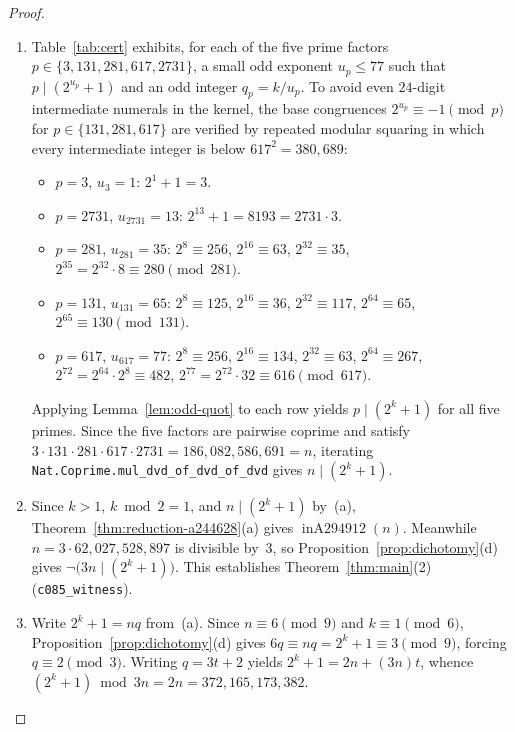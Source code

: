 \documentclass[11pt]{article}
\theoremstyle{definition}
\newcommand{\inA}{\operatorname{inA294912}}
\begin{document}
\begin{proof}
\begin{enumerate}
\item[\textup{(a)}] Table~\ref{tab:cert} exhibits, for each of the five prime factors $p \in \{3, 131, 281, 617, 2731\}$, a small odd exponent $u_p \le 77$ such that $p \mid (2^{u_p} + 1)$ and an odd integer $q_p = k / u_p$. To avoid even $24$-digit intermediate numerals in the kernel, the base congruences $2^{u_p} \equiv -1 \pmod p$ for $p \in \{131, 281, 617\}$ are verified by repeated modular squaring in which every intermediate integer is below $617^2 = 380{,}689$:
\begin{itemize}
\item $p = 3$, $u_3 = 1$: $2^1 + 1 = 3$.
\item $p = 2731$, $u_{2731} = 13$: $2^{13} + 1 = 8193 = 2731 \cdot 3$.
\item $p = 281$, $u_{281} = 35$: $2^8 \equiv 256$, $2^{16} \equiv 63$, $2^{32} \equiv 35$, $2^{35} = 2^{32} \cdot 8 \equiv 280 \pmod{281}$.
\item $p = 131$, $u_{131} = 65$: $2^8 \equiv 125$, $2^{16} \equiv 36$, $2^{32} \equiv 117$, $2^{64} \equiv 65$, $2^{65} \equiv 130 \pmod{131}$.
\item $p = 617$, $u_{617} = 77$: $2^8 \equiv 256$, $2^{16} \equiv 134$, $2^{32} \equiv 63$, $2^{64} \equiv 267$, $2^{72} = 2^{64} \cdot 2^8 \equiv 482$, $2^{77} = 2^{72} \cdot 32 \equiv 616 \pmod{617}$.
\end{itemize}
Applying Lemma~\ref{lem:odd-quot} to each row yields $p \mid (2^k + 1)$ for all five primes. Since the five factors are pairwise coprime and satisfy $3 \cdot 131 \cdot 281 \cdot 617 \cdot 2731 = 186{,}082{,}586{,}691 = n$, iterating \texttt{Nat.Coprime.mul\_dvd\_of\_dvd\_of\_dvd} gives $n \mid (2^k + 1)$.
\item[\textup{(b)}] Since $k > 1$, $k \bmod 2 = 1$, and $n \mid (2^k + 1)$ by~(a), Theorem~\ref{thm:reduction-a244628}(a) gives $\inA(n)$. Meanwhile $n = 3 \cdot 62{,}027{,}528{,}897$ is divisible by~$3$, so Proposition~\ref{prop:dichotomy}(d) gives $\neg\bigl(3n \mid (2^k + 1)\bigr)$. This establishes Theorem~\ref{thm:main}(2) (\texttt{c085\_witness}).
\item[\textup{(c)}] Write $2^k + 1 = nq$ from~(a). Since $n \equiv 6 \pmod 9$ and $k \equiv 1 \pmod 6$, Proposition~\ref{prop:dichotomy}(d) gives $6q \equiv nq = 2^k + 1 \equiv 3 \pmod 9$, forcing $q \equiv 2 \pmod 3$. Writing $q = 3t + 2$ yields $2^k + 1 = 2n + (3n)t$, whence $(2^k + 1) \bmod 3n = 2n = 372{,}165{,}173{,}382$. \qedhere
\end{enumerate}
\end{proof}
\end{document}
